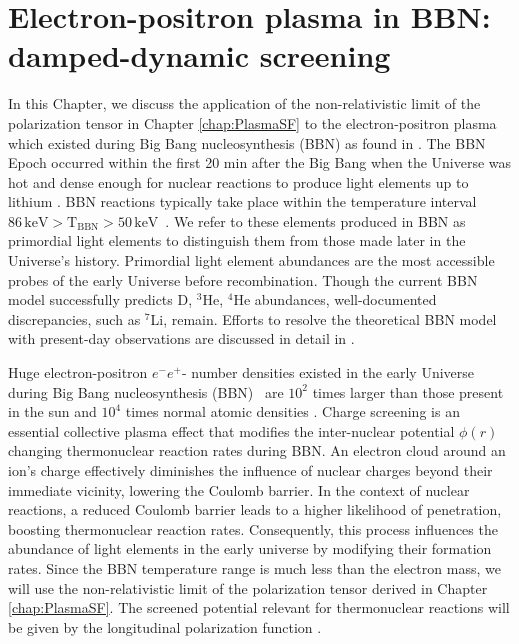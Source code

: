 \section{Electron-positron plasma in BBN: damped-dynamic screening}\label{chap:bbn}

In this Chapter, we discuss the application of the non-relativistic limit of the polarization tensor in Chapter \ref{chap:PlasmaSF} to the electron-positron plasma which existed during Big Bang nucleosynthesis (BBN) as found in \cite{Grayson:2023flr}. The BBN Epoch occurred within the first 20 min after the Big Bang when the Universe was hot and dense enough for nuclear reactions to produce light elements up to lithium \cite{Pitrou:2018cgg}. BBN reactions typically take place within the temperature interval $86\, \mathrm{keV}>\mathrm{T_{BBN}}>50\, \mathrm{keV}$~\cite{Pitrou:2018cgg}. We refer to these elements produced in BBN as primordial light elements to distinguish them from those made later in the Universe's history. Primordial light element abundances are the most accessible probes of the early Universe before recombination. Though the current BBN model successfully predicts D, $^3$He, $^4$He abundances, well-documented discrepancies, such as $^7$Li, remain. Efforts to resolve the theoretical BBN model with present-day observations are discussed in detail in \cite{Pitrou:2021vqr,Bertulani:2022qly}.

Huge electron-positron $e^-e^+$- number densities existed in the early Universe during Big Bang nucleosynthesis (BBN)~\cite{Wang:2010px,Hwang:2021kno,Rafelski:2023emw} are $10^2$ times larger than those present in the sun \cite{Bahcall:2001smc} and $10^4$ times normal atomic densities \cite{Grayson:2023flr}. Charge screening is an essential collective plasma effect that modifies the inter-nuclear potential $\phi(r)$ changing thermonuclear reaction rates during BBN. An electron cloud around an ion's charge effectively diminishes the influence of nuclear charges beyond their immediate vicinity, lowering the Coulomb barrier. In the context of nuclear reactions, a reduced Coulomb barrier leads to a higher likelihood of penetration, boosting thermonuclear reaction rates. Consequently, this process influences the abundance of light elements in the early universe by modifying their formation rates. Since the BBN temperature range is much less than the electron mass, we will use the non-relativistic limit of the polarization tensor derived in Chapter \ref{chap:PlasmaSF}. The screened potential relevant for thermonuclear reactions will be given by the longitudinal polarization function .

